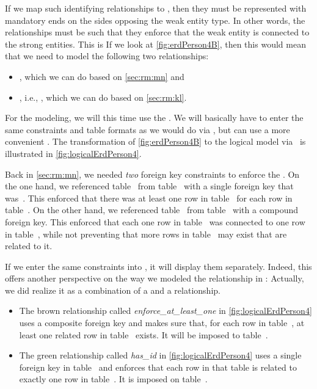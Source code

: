 If we map such identifying relationships to \sql, then they must be represented with mandatory ends on the sides opposing the weak entity type.
In other words, the relationships must be such that they enforce that the weak entity is connected to the strong entities.
This is
If we look at \cref{fig:erdPerson4B}, then this would mean that we need to model the following two relationships:%
%
\begin{itemize}%
\item {}, which we can do based on \cref{sec:rm:mn} and%
\item {}, i.e., , which we can do based on \cref{sec:rm:kl}.%
\end{itemize}%
%
For the modeling, we will this time use the \pgmodeler.
We will basically have to enter the same constraints and table formats as we would do via \sql, but can use a  more convenient .
The transformation of \cref{fig:erdPerson4B} to the logical model via \pgmodeler\ is illustrated in \cref{fig:logicalErdPerson4}.%
%
\begin{sloppypar}%
Back in \cref{sec:rm:mn}, we needed \emph{two} foreign key  constraints to enforce the .
On the one hand, we referenced table~ from table~ with a single foreign key that was~.
This enforced that there was at least one row in table~ for each row in table~.
On the other hand, we referenced table~ from table~ with a compound foreign key.
This enforced that each one row in table~ was connected to one row in table~, while not preventing that more rows in table~ may exist that are related to it.%
\end{sloppypar}%
%
If we enter the same constraints into \pgmodeler, it will display them separately.
Indeed, this offers another perspective on the way we modeled the  relationship in \sql:
Actually, we did realize it as a combination of a  and a  relationship.%
%
\begin{itemize}\sloppy%
%
\item The brown  relationship called \emph{enforce\_at\_least\_one} in \cref{fig:logicalErdPerson4} uses a composite foreign key and makes sure that, for each row in table~, at least one related row in table~ exists.
It will be imposed to table~.%
%
\item The green  relationship called \emph{has\_id} in \cref{fig:logicalErdPerson4} uses a single foreign key in table~ and enforces that each row in that table is related to exactly one row in table~.%
It is imposed on table~.%
%
\end{itemize}\fussy%
